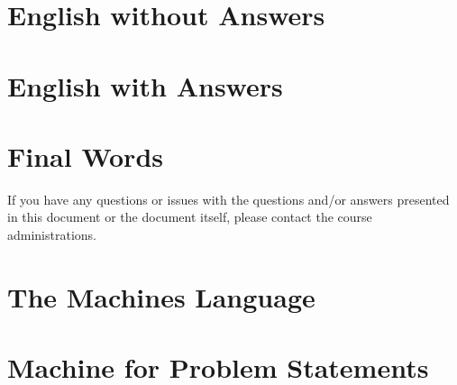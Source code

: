 \documentclass[a4paper,11pt,oneside]{book}
\begin{document}
\begin{sloppypar}
\chapter{English without Answers}
\label{englishWithoutAnswers}


\chapter{English with Answers}
\label{englishWithAnswers}










\chapter{Final Words}
\label{finalWords}
If you have any questions or issues with the questions and/or answers presented in this document or the document itself, please contact the course administrations.

\pagebreak

\appendix

\chapter{The Machines Language}
\label{machinesLanguage}


\chapter{Machine for Problem Statements}
\label{machineForProblemStatements}


\printbibliography

\end{sloppypar}
\end{document}
